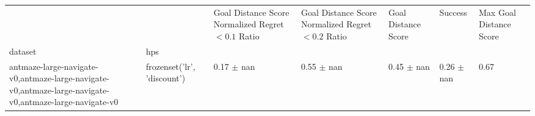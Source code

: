 \begin{tabular}{lllllll}
\toprule
 &  & Goal Distance Score Normalized Regret $< 0.1$ Ratio & Goal Distance Score Normalized Regret $< 0.2$ Ratio & Goal Distance Score & Success & Max Goal Distance Score \\
dataset & hps &  &  &  &  &  \\
\midrule
antmaze-large-navigate-v0,antmaze-large-navigate-v0,antmaze-large-navigate-v0,antmaze-large-navigate-v0 & frozenset({'lr', 'discount'}) & 0.17 $\pm$ nan & 0.55 $\pm$ nan & 0.45 $\pm$ nan & 0.26 $\pm$ nan & 0.67 \\
\cline{1-7}
\bottomrule
\end{tabular}
